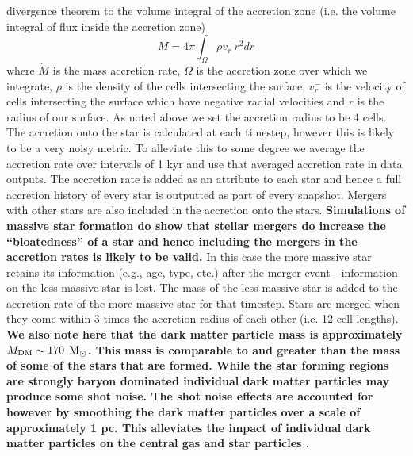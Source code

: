 \documentclass[twocolumn,iop,revtex4]{openjournal}
\newcommand{\msolarc} {$\rm{M_{\odot}}$}
\begin{document}
divergence theorem to the volume integral of the accretion zone \citep[e.g][]{Bleuler_2014}
(i.e. the volume integral of flux inside the accretion zone)
\begin{equation}
  \dot{M} = 4\pi \int_\Omega { \rho v_r^- r^2 dr}
\end{equation}
where $\dot{M}$ is the mass accretion rate, $\Omega$ is the accretion zone over which we integrate,
$\rho$ is the
density of the cells intersecting the surface, $v_r^-$ is the velocity of cells intersecting
the surface which have negative radial velocities and $r$ is the radius of our surface. As noted above we
set the accretion radius to be 4 cells. The accretion onto the star is calculated at each timestep,
however this is likely to be a very noisy metric. To alleviate this to some degree we average
the accretion rate over intervals of 1 kyr and use that averaged accretion rate in data outputs.
The accretion rate is added as an attribute to each star and hence a full
accretion history of every star is outputted as part of every snapshot. Mergers with other stars
are also included in the accretion onto the stars. \textbf{Simulations of massive star formation
\citep[e.g.][]{Meyer_2020} do show that stellar mergers do increase the “bloatedness” of a star
and hence including the mergers in the accretion rates is likely to be valid.}
In this case the more massive star retains its
information (e.g., age, type, etc.) after the merger event - information on the less massive star is
lost. The mass of the less massive star is added to the accretion rate of the more massive star for
that timestep. Stars are merged when they come within 3 times the accretion radius of each other (i.e. 12 cell lengths).
\textbf{We also note here that the dark matter particle mass is approximately $M_{\rm DM} \sim 170$ \msolarc.
  This mass is comparable to and greater than the mass of some of the stars that are formed. While
  the star forming regions are strongly baryon dominated individual dark matter particles may produce
  some shot noise. The shot noise effects are accounted for however by smoothing the dark matter particles
  over a scale of approximately 1 pc. This alleviates the impact of individual dark matter particles
  on the central gas and star particles \citep[e.g.][]{Regan_2015}. \\}
\end{document}
